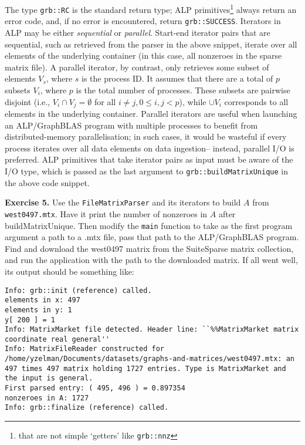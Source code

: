 The type \texttt{grb::RC} is the standard return type; ALP primitives\footnote{that are not simple `getters' like \texttt{grb::nnz}} always return an error code, and, if no error is encountered, return \texttt{grb::SUCCESS}. Iterators in ALP may be either \emph{sequential} or \emph{parallel}. Start-end iterator pairs that are sequential, such as retrieved from the parser in the above snippet, iterate over all elements of the underlying container (in this case, all nonzeroes in the sparse matrix file). A parallel iterator, by contrast, only retrieves some subset of elements $V_s$, where $s$ is the process ID. It assumes that there are a total of $p$ subsets $V_i$, where $p$ is the total number of processes. These subsets are pairwise disjoint (i.e., $V_i\cap V_j=\emptyset$ for all $i\neq j, 0\leq i,j<p$), while $\cup V_i$ corresponds to all elements in the underlying container. Parallel iterators are useful when launching an ALP/GraphBLAS program with multiple processes to benefit from distributed-memory parallelisation; in such cases, it would be wasteful if every process iterates over all data elements on data ingestion-- instead, parallel I/O is preferred. ALP primitives that take iterator pairs as input must be aware of the I/O type, which is passed as the last argument to \texttt{grb::buildMatrixUnique} in the above code snippet.

\noindent \textbf{Exercise 5.} Use the \texttt{FileMatrixParser} and its iterators to build $A$ from \texttt{west0497.mtx}. Have it print the number of nonzeroes in $A$ after buildMatrixUnique. Then modify the \texttt{main} function to take as the first program argument a path to a .mtx file, pass that path to the ALP/GraphBLAS program. Find and download the west0497 matrix from the SuiteSparse matrix collection, and run the application with the path to the downloaded matrix. If all went well, its output should be something like:
\begin{lstlisting}[keywordstyle=\ttfamily]
Info: grb::init (reference) called.
elements in x: 497
elements in y: 1
y[ 200 ] = 1
Info: MatrixMarket file detected. Header line: ``%%MatrixMarket matrix coordinate real general''
Info: MatrixFileReader constructed for /home/yzelman/Documents/datasets/graphs-and-matrices/west0497.mtx: an 497 times 497 matrix holding 1727 entries. Type is MatrixMarket and the input is general.
First parsed entry: ( 495, 496 ) = 0.897354
nonzeroes in A: 1727
Info: grb::finalize (reference) called.
\end{lstlisting}

